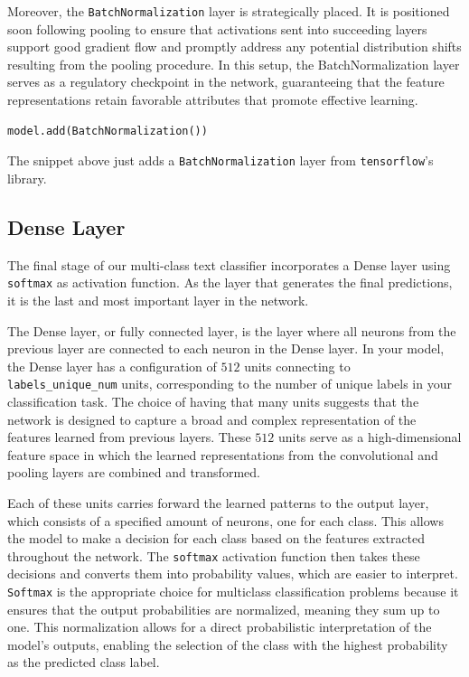 Moreover, the \verb|BatchNormalization| layer is strategically placed. It is positioned soon following pooling to ensure that activations sent into succeeding layers support good gradient flow and promptly address any potential distribution shifts resulting from the pooling procedure. In this setup, the BatchNormalization layer serves as a regulatory checkpoint in the network, guaranteeing that the feature representations retain favorable attributes that promote effective learning.

\begin{lstlisting}[language=Python]
model.add(BatchNormalization())
\end{lstlisting}
The snippet above just adds a \verb|BatchNormalization| layer from \verb|tensorflow|'s library.

\subsection{Dense Layer}
The final stage of our multi-class text classifier incorporates a Dense layer using \verb|softmax| as activation function. As the layer that generates the final predictions, it is the last and most important layer in the network.

The Dense layer, or fully connected layer, is the layer where all neurons from the previous layer are connected to each neuron in the Dense layer. In your model, the Dense layer has a configuration of $512$ units connecting to \verb|labels_unique_num| units, corresponding to the number of unique labels in your classification task. The choice of having that many units suggests that the network is designed to capture a broad and complex representation of the features learned from previous layers. These $512$ units serve as a high-dimensional feature space in which the learned representations from the convolutional and pooling layers are combined and transformed.

Each of these units carries forward the learned patterns to the output layer, which consists of a specified amount of neurons, one for each class. This allows the model to make a decision for each class based on the features extracted throughout the network. The \verb|softmax| activation function then takes these decisions and converts them into probability values, which are easier to interpret. \verb|Softmax| is the appropriate choice for multiclass classification problems because it ensures that the output probabilities are normalized, meaning they sum up to one. This normalization allows for a direct probabilistic interpretation of the model's outputs, enabling the selection of the class with the highest probability as the predicted class label.


